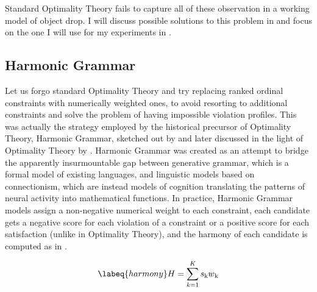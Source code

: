 Standard Optimality Theory fails to capture all of these observation in a working model of object drop. I will discuss possible solutions to this problem in  and focus on the one I will use for my experiments in .

\subsection{Harmonic Grammar}  %
Let us forgo standard Optimality Theory and try replacing ranked ordinal constraints with numerically weighted ones, to avoid resorting to additional constraints and solve the problem of having impossible violation profiles. 
This was actually the strategy employed by the historical precursor of Optimality Theory, Harmonic Grammar, sketched out by \textcite{smolensky1993integrating, legendre1990can, legendre1991unifying} and later discussed in the light of Optimality Theory by \textcite{legendre2006optimality, pater2009weighted}. Harmonic Grammar was created as an attempt to bridge the apparently insurmountable gap between generative grammar, which is a formal model of existing languages, and linguistic models based on connectionism, which are instead models of cognition translating the patterns of neural activity into mathematical functions. In practice, Harmonic Grammar models assign a non-negative numerical weight to each constraint, each candidate gets a negative score for each violation of a constraint or a positive score for each satisfaction (unlike in Optimality Theory), and the harmony of each candidate is computed as in . 

\begin{equation} \labeq{harmony} %
H = \sum_{k=1}^{K} s\textsubscript{k} w\textsubscript{k}
\end{equation}

